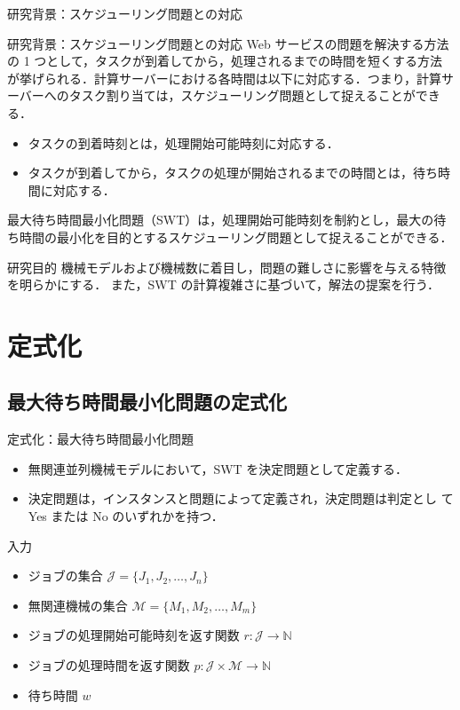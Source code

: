 \documentclass[dvipdfmx]{beamer}
\begin{document}
    \begin{frame}{研究背景：スケジューリング問題との対応}
      \begin{block}{研究背景：スケジューリング問題との対応}
        Web サービスの問題を解決する方法の 1 つとして，\alert{タスクが到着してから，処理されるまでの時間を短くする}方法が挙げられる．計算サーバーにおける各時間は以下に対応する．つまり，計算サーバーへのタスク割り当ては，スケジューリング問題として捉えることができる．
        \begin{itemize}
          \item タスクの到着時刻とは，\alert{処理開始可能時刻}に対応する．
          \item タスクが到着してから，タスクの処理が開始されるまでの時間とは，\alert{待ち時間}に対応する．
        \end{itemize}
        \alert{最大待ち時間最小化問題（SWT）}は，処理開始可能時刻を制約とし，最大の待ち時間の最小化を目的とするスケジューリング問題として捉えることができる．
      \end{block}

      \begin{block}{研究目的}
        機械モデルおよび機械数に着目し，問題の難しさに影響を与える特徴を明らかにする．
        また，SWT の計算複雑さに基づいて，解法の提案を行う．
      \end{block}

    \end{frame}
    \section{定式化}
    \subsection{最大待ち時間最小化問題の定式化}
    \begin{frame}{定式化：最大待ち時間最小化問題}
      \begin{itemize}
        \item {無関連並列機械モデルにおいて，SWT を\alert{決定問題}として定義する．}
        \item {決定問題は，インスタンスと問題によって定義され，決定問題は判定とし
        て Yes または No のいずれかを持つ．}
      \end{itemize}
      \begin{block}{入力}
        \begin{itemize}
          \item {ジョブの集合 $\mathcal{J} = \{J_1,J_2,\ldots,J_n\}$}
          \item {無関連機械の集合 $\mathcal{M} = \{M_1,M_2,\ldots,M_m\}$}
          \item {ジョブの処理開始可能時刻を返す関数 $r : \mathcal{J} \to \mathbb{N}$}
          \item {ジョブの処理時間を返す関数 $p : \mathcal{J} \times \mathcal{M} \to \mathbb{N}$}
          \item {待ち時間 $w$}
        \end{itemize}
      \end{block}
    \end{frame}
\end{document}
